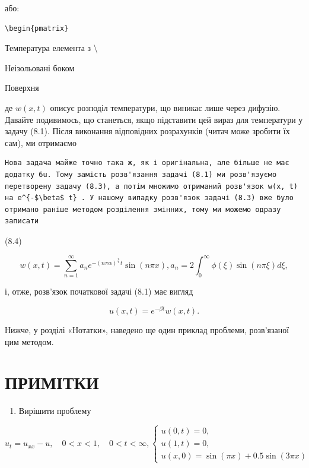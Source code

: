 \documentclass[
  ukrainian,
]{article}
\providecommand{\tightlist}{%
  \setlength{\itemsep}{0pt}\setlength{\parskip}{0pt}}
\begin{document}
або:

\begin{verbatim}
\begin{pmatrix}
\end{verbatim}

Температура елемента з \textbackslash{}

Неізольовані боком

Поверхня

де \(w(x, t)\) описує розподіл температури, що виникає лише через
дифузію. Давайте подивимось, що станеться, якщо підставити цей вираз для
температури у задачу (8.1). Після виконання відповідних розрахунків
(читач може зробити їх сам), ми отримаємо

\begin{verbatim}
Нова задача майже точно така ж, як і оригінальна, але більше не має додатку 6u. Тому замість розв'язання задачі (8.1) ми розв'язуємо перетворену задачу (8.3), а потім множимо отриманий розв'язок w(x, t) на e^{-$\beta$ t} . У нашому випадку розв'язок задачі (8.3) вже було отримано раніше методом розділення змінних, тому ми можемо одразу записати
\end{verbatim}

(8.4)

\[
w(x, t) = \sum_{n=1}^{\infty} a_n e^{-(n\pi\alpha)^{\frac{n}{2}}t} \sin(n\pi x),
a_n = 2 \int_0^{\infty} \phi(\xi) \sin(n\pi \xi) d\xi,
\]

і, отже, розв'язок початкової задачі (8.1) має вигляд

\[
u(x, t) = e^{-\beta t}w(x, t).
\]

Нижче, у розділі «Нотатки», наведено ще один приклад проблеми,
розв'язаної цим методом.

\section{ПРИМІТКИ}\label{ux43fux440ux438ux43cux456ux442ux43aux438}

\begin{enumerate}
\def\labelenumi{\arabic{enumi}.}
\tightlist
\item
  Вирішити проблему
\end{enumerate}

\[
u_t = u_{xx} - u, \quad 0 < x < 1, \quad 0 < t < \infty,
\begin{cases} u(0, t) = 0, \\ u(1, t) = 0, \\ u(x, 0) = \sin(\pi x) + 0.5\sin(3\pi x) \end{cases}
\]
\end{document}
